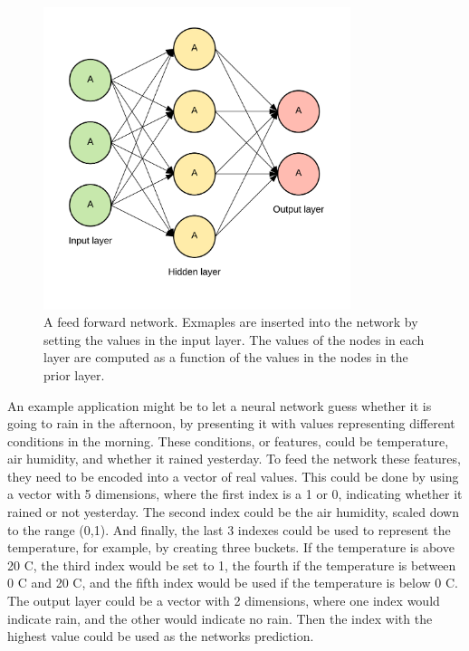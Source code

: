 \begin{figure}[htp]
	\centering
	\includegraphics[width=0.8\textwidth]{fig/neural-network.png}
	\caption{A feed forward network. Exmaples are inserted into the network by setting the values in the input layer. The values of the nodes in each layer are computed as a function of the values in the nodes in the prior layer.}
	\label{fig:neural-network}
\end{figure}

An example application might be to let a neural network guess whether it is going to rain in the afternoon, by presenting it with values representing different conditions in the morning. These conditions, or features, could be temperature, air humidity, and whether it rained yesterday. To feed the network these features, they need to be encoded into a vector of real values. This could be done by using a vector with 5 dimensions, where the first index is a 1 or 0, indicating whether it rained or not yesterday. The second index could be the air humidity, scaled down to the range (0,1). And finally, the last 3 indexes could be used to represent the temperature, for example, by creating three buckets. If the temperature is above 20 \degree C, the third index would be set to 1, the fourth if the temperature is between 0 \degree C and 20 \degree C, and the fifth index would be used if the temperature is below 0 \degree C. The output layer could be a vector with 2 dimensions, where one index would indicate rain, and the other would indicate no rain. Then the index with the highest value could be used as the networks prediction.

